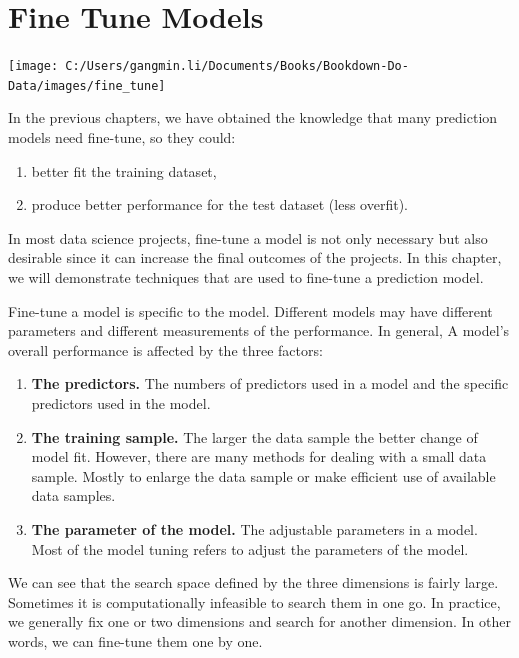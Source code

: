 \documentclass[
]{book}
\providecommand{\tightlist}{%
  \setlength{\itemsep}{0pt}\setlength{\parskip}{0pt}}
\begin{document}
\hypertarget{fine-tune-models}{%
\chapter{Fine Tune Models}\label{fine-tune-models}}

\begin{center}\texttt{[image: C:/Users/gangmin.li/Documents/Books/Bookdown-Do-Data/images/fine\_tune]} \end{center}

In the previous chapters, we have obtained the knowledge that many prediction models need fine-tune, so they could:

\begin{enumerate}
\def\labelenumi{\arabic{enumi}.}
\tightlist
\item
  better fit the training dataset,
\item
  produce better performance for the test dataset (less overfit).
\end{enumerate}

In most data science projects, fine-tune a model is not only necessary but also desirable since it can increase the final outcomes of the projects. In this chapter, we will demonstrate techniques that are used to fine-tune a prediction model.

Fine-tune a model is specific to the model. Different models may have different parameters and different measurements of the performance. In general, A model's overall performance is affected by the three factors:

\begin{enumerate}
\def\labelenumi{\arabic{enumi}.}
\tightlist
\item
  \textbf{The predictors.} The numbers of predictors used in a model and the specific predictors used in the model.
\item
  \textbf{The training sample.} The larger the data sample the better change of model fit. However, there are many methods for dealing with a small data sample. Mostly to enlarge the data sample or make efficient use of available data samples.
\item
  \textbf{The parameter of the model.} The adjustable parameters in a model. Most of the model tuning refers to adjust the parameters of the model.
\end{enumerate}

We can see that the search space defined by the three dimensions is fairly large. Sometimes it is computationally infeasible to search them in one go. In practice, we generally fix one or two dimensions and search for another dimension. In other words, we can fine-tune them one by one.
\end{document}
